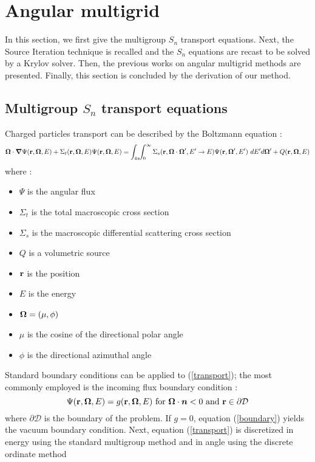 \section{Angular multigrid}
In this section, we first give the multigroup $S_n$ transport equations. Next,
the Source Iteration technique is recalled and the $S_n$ equations are
recast to be solved by a Krylov solver. Then, the previous works on angular
multigrid methods are presented. Finally, this section is concluded by the derivation
of our method.  
\subsection{Multigroup $S_n$ transport equations} 
Charged particles transport can be described by the Boltzmann equation :
\begin{equation}
\boldsymbol{\Omega} \cdot \boldsymbol{\nabla} \Psi(\mathbf{r},\boldsymbol{\Omega},E) + \Sigma_t(\mathbf{r},\boldsymbol{\Omega},E) \Psi(\mathbf{r},\boldsymbol{\Omega},E) =
\int_{4\pi}\!\!\int_{0}^{\infty}\Sigma_s(\mathbf{r},\boldsymbol{\Omega}\cdot\boldsymbol{\Omega}',E'\rightarrow
E)\Psi(\mathbf{r},\boldsymbol{\Omega}',E')\ dE'd\boldsymbol{\Omega}'+Q(\mathbf{r},\boldsymbol{\Omega},E) 
\label{transport}
\end{equation}
where :
\begin{itemize}
\item $\Psi$ is the angular flux
\item $\Sigma_t$ is the total macroscopic cross section
\item $\Sigma_s$ is the macroscopic differential scattering cross section
\item $Q$ is a volumetric source
\item $\mathbf{r}$ is the position
\item $E$ is the energy
\item $\boldsymbol{\Omega} = (\mu,\phi)$
\item $\mu$ is the cosine of the directional polar angle
\item $\phi$ is the directional azimuthal angle
\end{itemize}
Standard boundary conditions can be applied to (\ref{transport}); the most
commonly employed is the incoming flux boundary condition :
\begin{equation}
\Psi(\mathbf{r},\boldsymbol{\Omega},E) = g(\mathbf{r},\boldsymbol{\Omega},E)\textrm{ for }\boldsymbol{\Omega}\cdot\boldsymbol{n}<0\textrm{ and
}\mathbf{r}\in \partial \mathcal{D}
\label{boundary}
\end{equation} 
where $\partial \mathcal{D}$ is the boundary of the problem. If $g=0$, equation
(\ref{boundary}) yields the vacuum boundary condition.
Next, equation (\ref{transport}) is discretized in energy using the standard 
multigroup method \cite{reuss} and in angle using the discrete ordinate method
